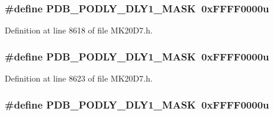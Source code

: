 \subsubsection[{\texorpdfstring{P\+D\+B\+\_\+\+P\+O\+D\+L\+Y\+\_\+\+D\+L\+Y1\+\_\+\+M\+A\+SK}{PDB_PODLY_DLY1_MASK}}]{\setlength{\rightskip}{0pt plus 5cm}\#define P\+D\+B\+\_\+\+P\+O\+D\+L\+Y\+\_\+\+D\+L\+Y1\+\_\+\+M\+A\+SK~0x\+F\+F\+F\+F0000u}\hypertarget{group___p_d_b___register___masks_ga548246bef07975bd6f1fe0fe5a2c6ef5}{}\label{group___p_d_b___register___masks_ga548246bef07975bd6f1fe0fe5a2c6ef5}


Definition at line 8618 of file M\+K20\+D7.\+h.

\subsubsection[{\texorpdfstring{P\+D\+B\+\_\+\+P\+O\+D\+L\+Y\+\_\+\+D\+L\+Y1\+\_\+\+M\+A\+SK}{PDB_PODLY_DLY1_MASK}}]{\setlength{\rightskip}{0pt plus 5cm}\#define P\+D\+B\+\_\+\+P\+O\+D\+L\+Y\+\_\+\+D\+L\+Y1\+\_\+\+M\+A\+SK~0x\+F\+F\+F\+F0000u}\hypertarget{group___p_d_b___register___masks_ga548246bef07975bd6f1fe0fe5a2c6ef5}{}\label{group___p_d_b___register___masks_ga548246bef07975bd6f1fe0fe5a2c6ef5}


Definition at line 8623 of file M\+K20\+D7.\+h.

\subsubsection[{\texorpdfstring{P\+D\+B\+\_\+\+P\+O\+D\+L\+Y\+\_\+\+D\+L\+Y1\+\_\+\+M\+A\+SK}{PDB_PODLY_DLY1_MASK}}]{\setlength{\rightskip}{0pt plus 5cm}\#define P\+D\+B\+\_\+\+P\+O\+D\+L\+Y\+\_\+\+D\+L\+Y1\+\_\+\+M\+A\+SK~0x\+F\+F\+F\+F0000u}\hypertarget{group___p_d_b___register___masks_ga548246bef07975bd6f1fe0fe5a2c6ef5}{}\label{group___p_d_b___register___masks_ga548246bef07975bd6f1fe0fe5a2c6ef5}


